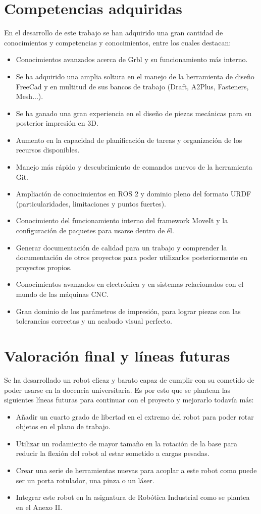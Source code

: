 \section{Competencias adquiridas}
En el desarrollo de este trabajo se han adquirido una gran cantidad de conocimientos y competencias y conocimientos, 
entre los cuales destacan:
\begin{itemize}
\item Conocimientos avanzados acerca de Grbl y su funcionamiento más interno.
\item Se ha adquirido una amplia soltura en el manejo de la herramienta de diseño FreeCad y en multitud de sus bancos de trabajo (Draft, A2Plus, Fasteners, Mesh...).
\item Se ha ganado una gran experiencia en el diseño de piezas mecánicas para su posterior impresión en 3D.
\item Aumento en la capacidad de planificación de tareas y organización de los recursos disponibles.
\item Manejo más rápido y descubrimiento de comandos nuevos de la herramienta Git.
\item Ampliación de conocimientos en ROS 2 y dominio pleno del formato URDF (particularidades, limitaciones y puntos fuertes).
\item Conocimiento del funcionamiento interno del framework MoveIt y la configuración de paquetes para usarse dentro de él.
\item Generar documentación de calidad para un trabajo y comprender la documentación de otros proyectos para poder 
utilizarlos posteriormente en proyectos propios.
\item Conocimientos avanzados en electrónica y en sistemas relacionados con el mundo de las máquinas CNC.
\item Gran dominio de los parámetros de impresión, para lograr piezas con las tolerancias correctas y un acabado visual perfecto. 
\end{itemize}


\section{Valoración final y líneas futuras}
Se ha desarrollado un robot eficaz y barato capaz de cumplir con su cometido de poder usarse en la docencia universitaria. Es por esto 
que se plantean las siguientes líneas futuras para continuar con el proyecto y mejorarlo todavía más:

\begin{itemize}
    \item Añadir un cuarto grado de libertad en el extremo del robot para poder rotar objetos en el plano de trabajo.
    \item Utilizar un rodamiento de mayor tamaño en la rotación de la base para reducir la flexión del robot al estar sometido 
    a cargas pesadas.
    \item Crear una serie de herramientas nuevas para acoplar a este robot como puede ser un porta rotulador, una pinza o un láser.
    \item Integrar este robot en la asignatura de Robótica Industrial como se plantea en el Anexo II. 
\end{itemize}


